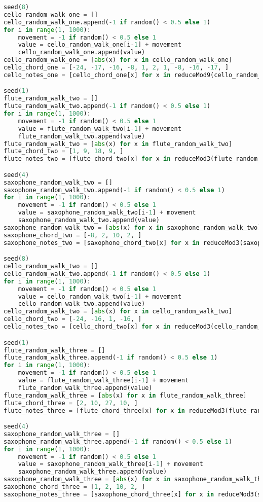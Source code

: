 \begin{lstlisting}[language=Python, caption=Four Ages of Sand Segment\_I]
seed(8)
cello_random_walk_one = []
cello_random_walk_one.append(-1 if random() < 0.5 else 1)
for i in range(1, 1000):
    movement = -1 if random() < 0.5 else 1
    value = cello_random_walk_one[i-1] + movement
    cello_random_walk_one.append(value)
cello_random_walk_one = [abs(x) for x in cello_random_walk_one]
cello_chord_one = [-24, -17, -16, -8, 1, 2, 1, -8, -16, -17, ]
cello_notes_one = [cello_chord_one[x] for x in reduceMod9(cello_random_walk_one)]

seed(1)
flute_random_walk_two = []
flute_random_walk_two.append(-1 if random() < 0.5 else 1)
for i in range(1, 1000):
    movement = -1 if random() < 0.5 else 1
    value = flute_random_walk_two[i-1] + movement
    flute_random_walk_two.append(value)
flute_random_walk_two = [abs(x) for x in flute_random_walk_two]
flute_chord_two = [1, 9, 18, 9, ]
flute_notes_two = [flute_chord_two[x] for x in reduceMod3(flute_random_walk_two)]

seed(4)
saxophone_random_walk_two = []
saxophone_random_walk_two.append(-1 if random() < 0.5 else 1)
for i in range(1, 1000):
    movement = -1 if random() < 0.5 else 1
    value = saxophone_random_walk_two[i-1] + movement
    saxophone_random_walk_two.append(value)
saxophone_random_walk_two = [abs(x) for x in saxophone_random_walk_two]
saxophone_chord_two = [-8, 2, 10, 2, ]
saxophone_notes_two = [saxophone_chord_two[x] for x in reduceMod3(saxophone_random_walk_two)]

seed(8)
cello_random_walk_two = []
cello_random_walk_two.append(-1 if random() < 0.5 else 1)
for i in range(1, 1000):
    movement = -1 if random() < 0.5 else 1
    value = cello_random_walk_two[i-1] + movement
    cello_random_walk_two.append(value)
cello_random_walk_two = [abs(x) for x in cello_random_walk_two]
cello_chord_two = [-24, -16, 1, -16, ]
cello_notes_two = [cello_chord_two[x] for x in reduceMod3(cello_random_walk_two)]

seed(1)
flute_random_walk_three = []
flute_random_walk_three.append(-1 if random() < 0.5 else 1)
for i in range(1, 1000):
    movement = -1 if random() < 0.5 else 1
    value = flute_random_walk_three[i-1] + movement
    flute_random_walk_three.append(value)
flute_random_walk_three = [abs(x) for x in flute_random_walk_three]
flute_chord_three = [2, 10, 27, 10, ]
flute_notes_three = [flute_chord_three[x] for x in reduceMod3(flute_random_walk_three)]

seed(4)
saxophone_random_walk_three = []
saxophone_random_walk_three.append(-1 if random() < 0.5 else 1)
for i in range(1, 1000):
    movement = -1 if random() < 0.5 else 1
    value = saxophone_random_walk_three[i-1] + movement
    saxophone_random_walk_three.append(value)
saxophone_random_walk_three = [abs(x) for x in saxophone_random_walk_three]
saxophone_chord_three = [1, 2, 10, 2, ]
saxophone_notes_three = [saxophone_chord_three[x] for x in reduceMod3(saxophone_random_walk_three)]


\end{lstlisting}
